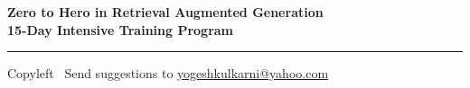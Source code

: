 
\graphicspath{{images/}}

\footnotesize


\begin{center}
\Large{\textbf{Zero to Hero in Retrieval Augmented Generation\\ 15-Day Intensive Training Program}}  
\end{center}

\begin{multicols}{3}

\end{multicols}

\rule{\linewidth}{0.25pt}
\scriptsize
Copyleft \textcopyleft\  Send suggestions to 
\href{http://www.yogeshkulkarni.com}{yogeshkulkarni@yahoo.com}


